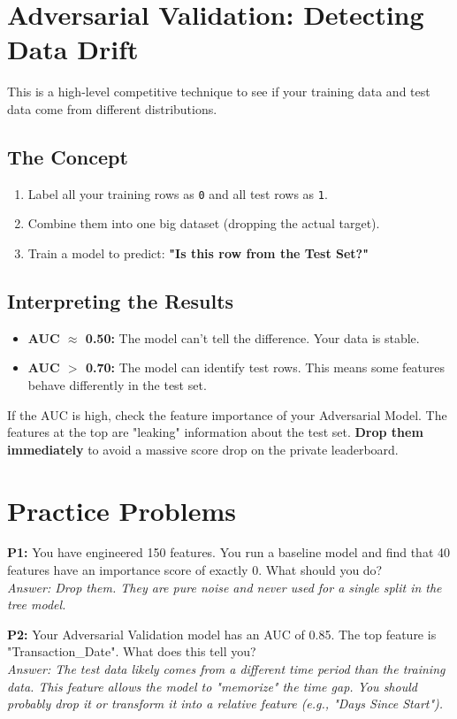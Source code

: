 \documentclass{article}
\begin{document}
\section{Adversarial Validation: Detecting Data Drift}
This is a high-level competitive technique to see if your training data and test data come from different distributions.

\subsection{The Concept}
\begin{enumerate}
    \item Label all your training rows as \texttt{0} and all test rows as \texttt{1}.
    \item Combine them into one big dataset (dropping the actual target).
    \item Train a model to predict: \textbf{"Is this row from the Test Set?"}
\end{enumerate}

\subsection{Interpreting the Results}
\begin{itemize}
    \item \textbf{AUC $\approx$ 0.50:} The model can't tell the difference. Your data is stable.
    \item \textbf{AUC $>$ 0.70:} The model can identify test rows. This means some features behave differently in the test set.
\end{itemize}

\begin{tcolorbox}[colback=red!5!white,colframe=red!75!black,title=Action Plan]
If the AUC is high, check the feature importance of your Adversarial Model. The features at the top are "leaking" information about the test set. \textbf{Drop them immediately} to avoid a massive score drop on the private leaderboard.
\end{tcolorbox}

\section{Practice Problems}
\textbf{P1:} You have engineered 150 features. You run a baseline model and find that 40 features have an importance score of exactly 0. What should you do? \\
\textit{Answer: Drop them. They are pure noise and never used for a single split in the tree model.}

\textbf{P2:} Your Adversarial Validation model has an AUC of 0.85. The top feature is "Transaction\_Date". What does this tell you? \\
\textit{Answer: The test data likely comes from a different time period than the training data. This feature allows the model to "memorize" the time gap. You should probably drop it or transform it into a relative feature (e.g., "Days Since Start").}
\end{document}
